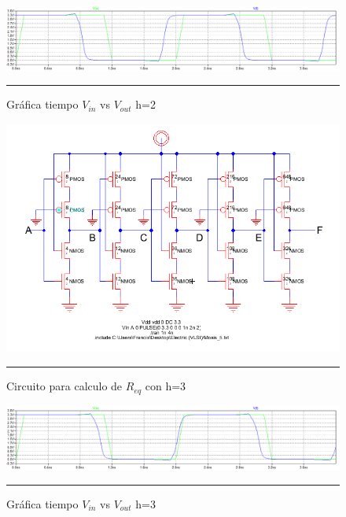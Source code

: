 \documentclass[12pt,a4paper]{article} %
\begin{document}
\begin{figure}[htbp]
  \centering
    \includegraphics[scale=0.4]{./FO2.png}
    \rule{35em}{1pt}
  \caption[Captura]{Gráfica tiempo $V_{in}$ vs $V_{out}$ h=2}
  \label{fig:FO2}
\end{figure}

\begin{figure}[htbp]
\begin{center}
    \includegraphics[scale=0.5]{./CircuitoFO3.png}
    \rule{35em}{0.5pt}
  \caption[Captura]{Circuito para calculo de $R_{eq}$ con h=3}
  \label{fig:CircuitoFO3}
  
\end{center}
\end{figure}

\begin{figure}[htbp]
  \begin{center}
    \includegraphics[scale=0.4]{./FO3.png}
    \rule{35em}{0.5pt}
  \caption[Captura]{Gráfica tiempo $V_{in}$ vs $V_{out}$ h=3}
  \label{fig:FO3}
  \end{center}
\end{figure}
\end{document}
